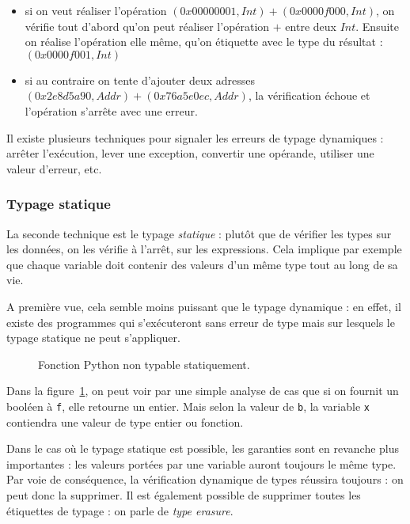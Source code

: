 \begin{itemize}
\item
  si on veut réaliser l'opération
  $(0x00000001, Int) + (0x0000f000, Int)$, on vérifie tout d'abord qu'on
  peut réaliser l'opération $+$ entre deux $Int$. Ensuite on réalise
  l'opération elle même, qu'on étiquette avec le type du résultat :
  $(0x0000f001, Int)$
\item
  si au contraire on tente d'ajouter deux adresses
  $(0x2e8d5a90, Addr) + (0x76a5e0ec, Addr)$, la vérification échoue et
  l'opération s'arrête avec une erreur.
\end{itemize}

Il existe plusieurs techniques pour signaler les erreurs de typage dynamiques :
arrêter l'exécution, lever une exception, convertir une opérande, utiliser une
valeur d'erreur, etc.

\subsubsection{Typage statique}

La seconde technique est le typage \emph{statique} : plutôt que de vérifier les
types sur les données, on les vérifie à l'arrêt, sur les expressions. Cela
implique par exemple que chaque variable doit contenir des valeurs d'un même
type tout au long de sa vie.

A première vue, cela semble moins puissant que le typage dynamique : en effet,
il existe des programmes qui s'exécuteront sans erreur de type mais sur lesquels
le typage statique ne peut s'appliquer.

\begin{figure}
  \caption{Fonction Python non typable statiquement.}
  \label{fig:nontypable}
\end{figure}

Dans la figure~\ref{fig:nontypable}, on peut voir par une simple analyse de cas
que si on fournit un booléen à \texttt{f}, elle retourne un entier. Mais selon
la valeur de \texttt{b}, la variable \texttt{x} contiendra une valeur de type
entier ou fonction.

Dans le cas où le typage statique est possible, les garanties sont en revanche
plus importantes : les valeurs portées par une variable auront toujours le même
type. Par voie de conséquence, la vérification dynamique de types réussira
toujours : on peut donc la supprimer. Il est également possible de supprimer
toutes les étiquettes de typage : on parle de \emph{type erasure}.

